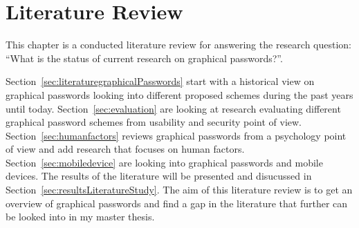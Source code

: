 \chapter{Literature Review}
    
  This chapter is a conducted literature review for answering the research question: ``What is the status of current research on graphical passwords?''. 

  Section~\ref{sec:literaturegraphicalPasswords} start with a historical view on graphical passwords looking into different proposed schemes during the past years until today. Section~\ref{sec:evaluation} are looking at research evaluating different graphical password schemes from usability and security point of view. Section~\ref{sec:humanfactors} reviews graphical passwords from a psychology point of view and add research that focuses on human factors. Section~\ref{sec:mobiledevice} are looking into graphical passwords and mobile devices. 
  The results of the literature will be presented and disucussed in Section~\ref{sec:resultsLiteratureStudy}. The aim of this literature review is to get an overview of graphical passwords and find a gap in the literature that further can be looked into in my master thesis. 

